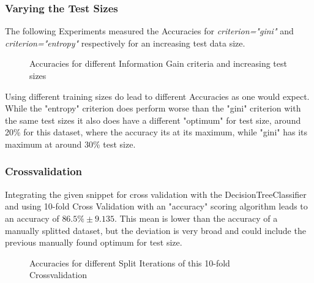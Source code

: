 \documentclass[a4paper, 11pt]{article}
\begin{document}
\subsubsection{Varying the Test Sizes}

The following Experiments measured the Accuracies for \textit{criterion="gini"} and \textit{criterion="entropy"} respectively for an increasing test data size.

\begin{figure}[H]
\centering
{}
\caption{Accuracies for different Information Gain criteria and increasing test sizes}
\end{figure}

Using different training sizes do lead to different Accuracies as one would expect. While the "entropy" criterion does perform worse than the "gini" criterion with the same test sizes it also does have a different "optimum" for test size, around 20\% for this dataset, where the accuracy its at its maximum, while "gini" has its maximum at around 30\% test size.

\subsubsection{Crossvalidation}

Integrating the given snippet for cross validation with the DecisionTreeClassifier and using 10-fold Cross Validation with an "accuracy" scoring algorithm leads to an accuracy of $ 86.5\% \pm 9.135 $.
This mean is lower than the accuracy of a manually splitted dataset, but the deviation is very broad and could include the previous manually found optimum for test size.

\begin{figure}[H]
\centering
{}
\caption{Accuracies for different Split Iterations of this 10-fold Crossvalidation}
\end{figure}
\end{document}
